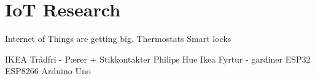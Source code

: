 \section{IoT Research}

Internet of Things are getting big. 
Thermostats
Smart locks

IKEA Trådfri - Pærer + Stikkontakter
Philips Hue
Ikea Fyrtur - gardiner
ESP32
ESP8266
Arduino Uno